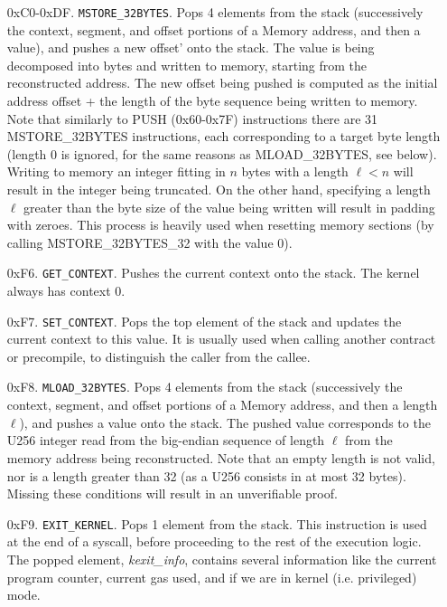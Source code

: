 \begin{enumerate}[align=left]
  \item[0xC0-0xDF.] \texttt{MSTORE\_32BYTES}. Pops 4 elements from the stack (successively the context, segment, and offset portions of a Memory address, and then a value), and pushes
  a new offset' onto the stack. The value is being decomposed into bytes and written to memory, starting from the reconstructed address. The new offset being pushed is computed as the
  initial address offset + the length of the byte sequence being written to memory. Note that similarly to PUSH (0x60-0x7F) instructions there are 31 MSTORE\_32BYTES instructions, each
  corresponding to a target byte length (length 0 is ignored, for the same reasons as MLOAD\_32BYTES, see below). Writing to memory an integer fitting in $n$ bytes with a length $\ell < n$ will
  result in the integer being truncated. On the other hand, specifying a length $\ell$ greater than the byte size of the value being written will result in padding with zeroes. This
  process is heavily used when resetting memory sections (by calling MSTORE\_32BYTES\_32 with the value 0).

  \item[0xF6.] \texttt{GET\_CONTEXT}. Pushes the current context onto the stack. The kernel always has context 0.

  \item[0xF7.] \texttt{SET\_CONTEXT}. Pops the top element of the stack and updates the current context to this value. It is usually used when calling another contract or precompile,
  to distinguish the caller from the callee.

  \item[0xF8.] \texttt{MLOAD\_32BYTES}. Pops 4 elements from the stack (successively the context, segment, and offset portions of a Memory address, and then a length $\ell$), and pushes
  a value onto the stack. The pushed value corresponds to the U256 integer read from the big-endian sequence of length $\ell$ from the memory address being reconstructed. Note that an
  empty length is not valid, nor is a length greater than 32 (as a U256 consists in at most 32 bytes). Missing these conditions will result in an unverifiable proof.

  \item[0xF9.] \texttt{EXIT\_KERNEL}. Pops 1 element from the stack. This instruction is used at the end of a syscall, before proceeding to the rest of the execution logic.
  The popped element, \textit{kexit\_info}, contains several information like the current program counter, current gas used, and if we are in kernel (i.e. privileged) mode.


\end{enumerate}

